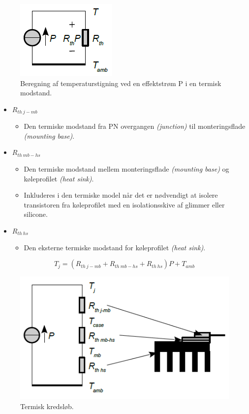 \documentclass[danish]{article}
\begin{document}
\begin{figure} [H]
	\centering
	\includegraphics[width=0.3\linewidth]{graphics/ohmslovanalogi}
	\caption{Beregning af temperaturstigning ved en effektstrøm P i en termisk modstand.}
	\label{fig:ohmslovanalogi}
\end{figure}

\begin{itemize}
	\item $R_{th\:j-mb}$
	\begin{itemize}
		\item Den termiske modstand fra PN overgangen \textit{(junction)} til monteringsflade	\textit{(mounting base)}.
	\end{itemize}
	\item $R_{th\: mb-hs}$
	\begin{itemize}
		\item Den termiske modstand mellem monteringsflade	\textit{(mounting base)} og køleprofilet \textit{(heat sink)}.
		\item Inkluderes i den termiske model når det er nødvendigt at isolere transistoren fra køleprofilet med en isolationsskive af glimmer eller silicone.
	\end{itemize} 
	\item $R_{th\: hs}$ 
	\begin{itemize}
		\item Den eksterne termiske modstand for køleprofilet \textit{(heat sink)}.
	\end{itemize}
\end{itemize}

\begin{equation}
T_j = (R_{th\:j-mb} + R_{th\: mb-hs} + R_{th\: hs})P + T_{amb}
\end{equation}

\begin{figure} [H]
	\centering
	\includegraphics[width=0.5\linewidth]{graphics/termiskdesign}
	\caption{Termisk kredsløb.}
	\label{fig:termiskdesign}
\end{figure}
\end{document}
